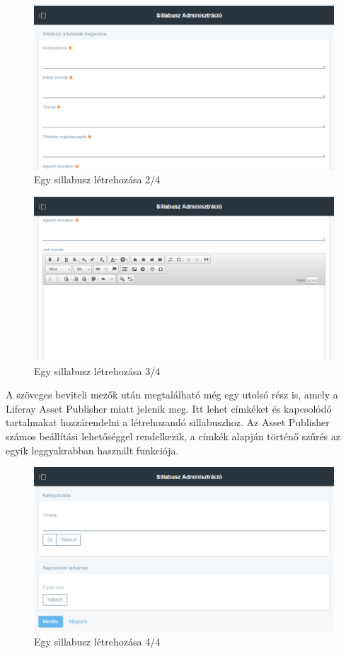 \documentclass[hidelinks, 12pt, a4paper]{report}
\begin{document}
\begin{figure}[H]
    \centering
	\includegraphics[width=\textwidth]{sm_syllabus_add_2.png}
	\caption{Egy sillabusz létrehozása 2/4}
\end{figure}

\begin{figure}[H]
    \centering
	\includegraphics[width=\textwidth]{sm_syllabus_add_3.png}
	\caption{Egy sillabusz létrehozása 3/4}
\end{figure}

A szöveges beviteli mezők után megtalálható még egy utolsó rész is, amely a Liferay Asset Publisher miatt jelenik meg. Itt lehet címkéket és kapcsolódó tartalmakat hozzárendelni a létrehozandó sillabuszhoz. Az Asset Publisher számos beállítási lehetőséggel rendelkezik, a címkék alapján történő szűrés az egyik leggyakrabban használt funkciója.

\begin{figure}[H]
    \centering
	\includegraphics[width=\textwidth]{sm_syllabus_add_4.png}
	\caption{Egy sillabusz létrehozása 4/4}
\end{figure}
\end{document}
